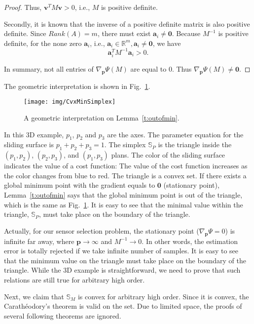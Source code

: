 \begin{proof}
Thus, $\mathbf{v}^T M \mathbf{v} > 0$, i.e., $M$ is positive definite.


Secondly, it is known that the inverse of a positive definite matrix is also positive definite.
    Since $Rank(A)=m$, there must exist $\mathbf{a}_i\neq \mathbf{0}$.
Because $M^{-1}$ is positive definite, for the none zero $\mathbf{a}_i$, i.e., $\mathbf{a}_i \in \mathbb{R}^m, \mathbf{a}_i\neq \mathbf{0}$, we have
$$\mathbf{a}_i^T M^{-1} \mathbf{a}_i > 0.$$


In summary, not all entries of $\nabla_{\mathbf{p}}\Psi(M)$ are equal to 0. Thus $\nabla_{\mathbf{p}}\Psi(M) \neq \mathbf{0}$.
\end{proof}


\begin{remark}
The geometric interpretation is shown in Fig.~\ref{f:outofmin}.
\begin{figure}
  \centering
  \texttt{[image: img/CvxMinSimplex]}
  \caption{A geometric interpretation on Lemma~\ref{t:outofmin}.}\label{f:outofmin}
\end{figure}
    In this 3D example, $p_1$, $p_2$ and $p_3$ are the axes. The parameter equation for the sliding surface is $p_1+p_2+p_3=1$. The simplex $\mathbb{S}_P$ is the triangle inside the $(p_1,p_2)$, $(p_2,p_3)$, and $(p_1,p_3)$ plans. The color of the sliding surface indicates the value of a cost function: The value of the cost function increases as the color changes from blue to red. The triangle is a convex set. If there exists a global minimum point with the gradient equals to $\mathbf{0}$ (stationary point), Lemma~\ref{t:outofmin} says that the global minimum point is out of the triangle, which is the same as Fig.~\ref{f:outofmin}. It is easy to see that the minimal value within the triangle, $\mathbb{S}_P$, must take place on the boundary of the triangle.


    Actually, for our sensor selection problem, the stationary point ($\nabla_{\mathbf{p}}\Psi = 0$) is infinite far away, where $\mathbf{p}\rightarrow \infty$ and $M^{-1} \rightarrow 0$. In other words, the estimation error is totally rejected if we take infinite number of samples.
    It is easy to see that the minimum value on the triangle must take place on the boundary of the triangle. While the 3D example is straightforward, we need to prove that such relations are still true for arbitrary high order.
\end{remark}

Next, we claim that $\mathbb{S}_M$ is convex for arbitrary high order. Since it is convex, the Carath\'{e}odory's theorem is valid on the set. Due to limited space, the proofs of several following theorems are ignored.

